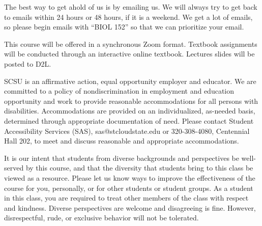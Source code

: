 \documentclass{tufte-handout}
\begin{document}
\begin{fullwidth}
 The best way to get ahold of us is by emailing us. We will always try to get back to emails within 24 hours or 48 hours, if it is a weekend. We get a lot of emails, so please begin emails with ``BIOL 152'' so that we can prioritize your email. 

 This course will be offered in a synchronous Zoom format. Textbook assignments will be conducted through an interactive online textbook. Lectures slides will be posted to D2L. 


 SCSU is an affirmative action, equal opportunity employer and educator. We are committed to a policy of nondiscrimination in employment and education opportunity and work to provide reasonable accommodations for all persons with disabilities. Accommodations are provided on an individualized, as-needed basis, determined through appropriate documentation of need. Please contact Student Accessibility Services (SAS), sas@stcloudstate.edu or 320-308-4080, Centennial Hall 202, to meet and discuss reasonable and appropriate accommodations. 

 It is our intent that students from diverse backgrounds and perspectives be well-served by this course, and that the diversity that students bring to this class be viewed as a resource. Please let us know ways to improve the effectiveness of the course for you, personally, or for other students or student groups. As a student in this class, you are required to treat other members of the class with respect and kindness. Diverse perspectives are welcome and disagreeing is fine. However, disrespectful, rude, or exclusive behavior will not be tolerated.


\end{fullwidth}

\end{document}
